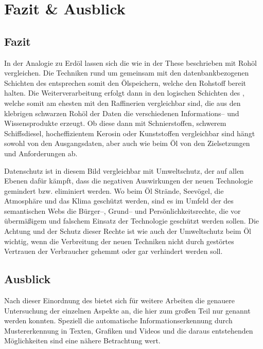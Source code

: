 \section{Fazit \& Ausblick}

\subsection{Fazit}

In der Analogie zu Erdöl lassen sich die  wie in der These beschrieben mit Rohöl vergleichen. Die Techniken rund um  gemeinsam mit den datenbankbezogenen Schichten des  entsprechen somit den Ölspeichern, welche den Rohstoff bereit halten. Die Weiterverarbeitung erfolgt dann in den logischen Schichten des , welche somit am ehesten mit den Raffinerien vergleichbar sind, die aus den klebrigen schwarzen Rohöl der Daten die verschiedenen Informations-- und Wissensprodukte erzeugt. Ob diese dann mit Schnierstoffen, schwerem Schiffsdiesel, hocheffizientem Kerosin oder Kunststoffen vergleichbar sind hängt sowohl von den Ausgangsdaten, aber auch wie beim Öl von den Zielsetzungen und Anforderungen ab.

Datenschutz ist in diesem Bild vergleichbar mit Umweltschutz, der auf allen Ebenen dafür kämpft, dass die negativen Auswirkungen der neuen Technologie gemindert bzw. eliminiert werden. Wo beim Öl Strände, Seevögel, die Atmosphäre und das Klima geschützt werden, sind es  im Umfeld der des semantischen Webs die Bürger--, Grund-- und Persönlichkeitsrechte, die vor übermäßigem und falschem Einsatz der Technologie geschützt werden sollen. Die Achtung und der Schutz dieser Rechte ist wie auch der Umweltschutz beim Öl wichtig, wenn die Verbreitung der neuen Techniken nicht durch gestörtes Vertrauen der Verbraucher gehemmt oder gar verhindert werden soll.

\subsection{Ausblick}
\label{ausblick}

Nach dieser Einordnung des  bietet sich für weitere Arbeiten die genauere Untersuchung der einzelnen Aspekte an, die hier zum großen Teil nur genannt werden konnten. Speziell die automatische Informationserkennung durch Mustererkennung in Texten, Grafiken und Videos und die daraus entstehenden Möglichkeiten sind eine nähere Betrachtung wert. 

